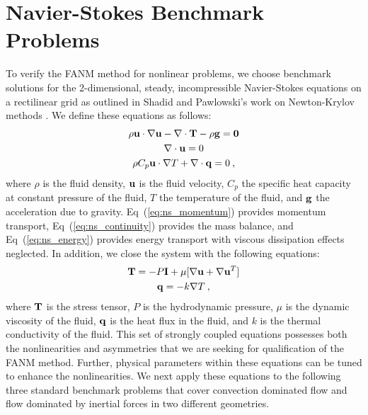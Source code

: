 \section{Navier-Stokes Benchmark Problems\ }
\label{sec:ns_benchmarks}
To verify the FANM method for nonlinear problems, we choose benchmark
solutions for the 2-dimensional, steady, incompressible Navier-Stokes
equations on a rectilinear grid as outlined in Shadid and Pawlowski's
work on Newton-Krylov methods
\cite{shadid_inexact_1997,pawlowski_globalization_2006}. We define
these equations as follows:
\begin{subequations}
  \begin{gather}
    \rho \mathbf{u} \cdot \nabla \mathbf{u} - \nabla \cdot \mathbf{T} - \rho
    \mathbf{g} = \mathbf{0}
    \label{eq:ns_momentum}\\
    \nabla \cdot \mathbf{u} = 0
    \label{eq:ns_continuity}\\
    \rho C_p \mathbf{u} \cdot \nabla T + \nabla \cdot \mathbf{q} = 0\:,
    \label{eq:ns_energy}
  \end{gather}
  \label{eq:navier_stokes}
\end{subequations}
where $\rho$ is the fluid density, $\mathbf{u}$ is the fluid velocity,
$C_p$ the specific heat capacity at constant pressure of the fluid,
$T$ the temperature of the fluid, and $\mathbf{g}$ the acceleration due to
gravity. Eq~(\ref{eq:ns_momentum}) provides momentum transport,
Eq~(\ref{eq:ns_continuity}) provides the mass balance, and
Eq~(\ref{eq:ns_energy}) provides energy transport with viscous
dissipation effects neglected. In addition, we close the system with
the following equations:
\begin{subequations}
  \begin{gather}
    \mathbf{T} = -P \mathbf{I} + \mu[\nabla \mathbf{u} + \nabla \mathbf{u}^T]
    \label{eq:ns_stress_tensor}\\
    \mathbf{q} = - k \nabla T\:,
    \label{eq:ns_heat_flux}
  \end{gather}
  \label{eq:ns_closure}
\end{subequations}
where $\mathbf{T}$ is the stress tensor, $P$ is the hydrodynamic pressure,
$\mu$ is the dynamic viscosity of the fluid, $\mathbf{q}$ is the heat flux
in the fluid, and $k$ is the thermal conductivity of the fluid. This
set of strongly coupled equations possesses both the nonlinearities
and asymmetries that we are seeking for qualification of the FANM
method. Further, physical parameters within these equations can be
tuned to enhance the nonlinearities. We next apply these equations to
the following three standard benchmark problems that cover convection
dominated flow and flow dominated by inertial forces in two different
geometries.


